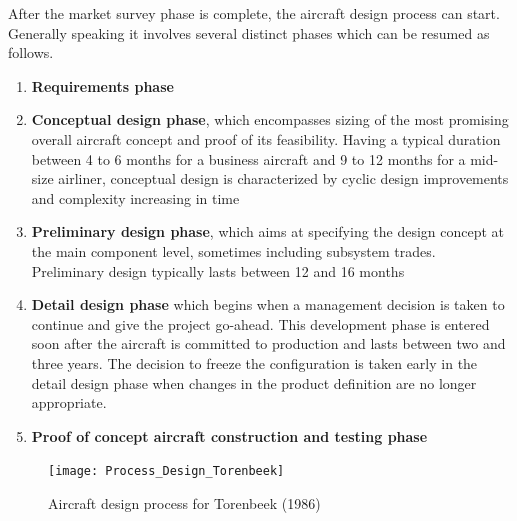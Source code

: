 \bigskip
\noindent
After the market survey phase is complete, the aircraft design process can start. Generally speaking it involves several distinct phases which can be resumed as follows.
%
\begin{enumerate}
\item \textbf{Requirements phase}
\item \textbf{Conceptual design phase}, which encompasses sizing of the most promising overall aircraft concept and proof of its feasibility. Having a typical duration between 4 to 6 months for a business aircraft and 9 to 12 months for a mid-size airliner, conceptual design is characterized by cyclic design improvements and complexity increasing in time
\item \textbf{Preliminary design phase}, which aims at specifying the design concept at the main component level, sometimes including subsystem trades. Preliminary design typically lasts between 12 and 16 months
\item \textbf{Detail design phase} which begins when a management decision is taken to continue and give the project go-ahead. This development phase is entered soon after the aircraft is committed to production and lasts between two and three years. The decision to freeze the configuration is taken early in the detail design phase when changes in the product definition are no longer appropriate.
\item \textbf{Proof of concept aircraft construction and testing phase}
\end{enumerate}
%
\begin{figure}[!t]
\centering
\texttt{[image: Process\_Design\_Torenbeek]}
\caption{Aircraft design process for Torenbeek (\num{1986})}
\end{figure}
%
